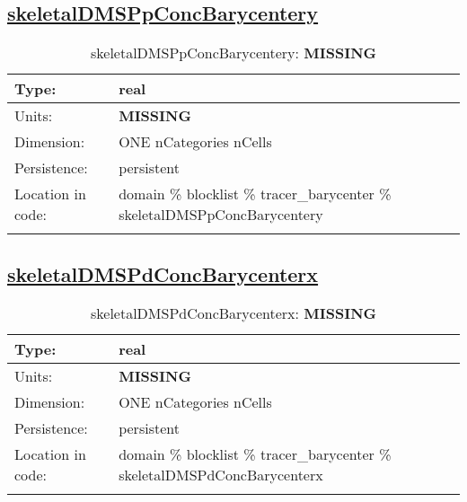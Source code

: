 \subsection[skeletalDMSPpConcBarycentery]{\hyperref[sec:var_tab_tracer_barycenter]{skeletalDMSPpConcBarycentery}}
\label{subsec:var_sec_tracer_barycenter_skeletalDMSPpConcBarycentery}
\begin{center}
\begin{longtable}{| p{2.0in} | p{4.0in} |}
        \hline 
        Type: & real \\
        \hline 
        Units: & {\bf \color{red} MISSING} \\
        \hline 
        Dimension: & ONE nCategories nCells \\
        \hline 
        Persistence: & persistent \\
        \hline 
         Location in code: & domain \% blocklist \% tracer\_barycenter \% skeletalDMSPpConcBarycentery \\
         \hline 
    \caption{skeletalDMSPpConcBarycentery: {\bf \color{red} MISSING}}
\end{longtable}
\end{center}
\subsection[skeletalDMSPdConcBarycenterx]{\hyperref[sec:var_tab_tracer_barycenter]{skeletalDMSPdConcBarycenterx}}
\label{subsec:var_sec_tracer_barycenter_skeletalDMSPdConcBarycenterx}
\begin{center}
\begin{longtable}{| p{2.0in} | p{4.0in} |}
        \hline 
        Type: & real \\
        \hline 
        Units: & {\bf \color{red} MISSING} \\
        \hline 
        Dimension: & ONE nCategories nCells \\
        \hline 
        Persistence: & persistent \\
        \hline 
         Location in code: & domain \% blocklist \% tracer\_barycenter \% skeletalDMSPdConcBarycenterx \\
         \hline 
    \caption{skeletalDMSPdConcBarycenterx: {\bf \color{red} MISSING}}
\end{longtable}
\end{center}
